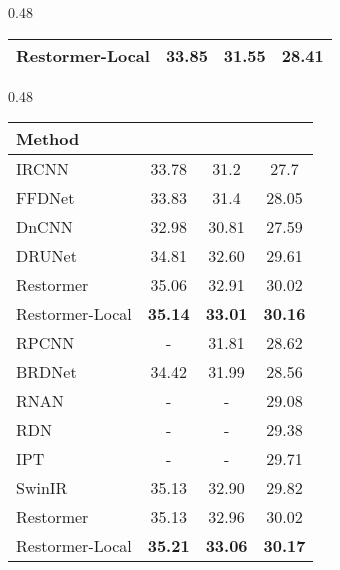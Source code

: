 \documentclass[runningheads]{llncs}
\begin{document}
\begin{table*}[t]
\begin{subtable}[t]{0.48\linewidth}
\begin{tabular}{l|ccc}
{Restormer-Local}              & \textbf{33.85}             & \textbf{31.55}             & \textbf{28.41}             \\     \bottomrule 
\end{tabular}
    \end{subtable}
\hfill
    \begin{subtable}[t]{0.48\linewidth}
    \scriptsize
    \centering
\caption{Gaussian color image denoising}
\label{table:colordenoising}
\begin{tabular}{l|ccc}
\toprule
{Method}                     &    &    &    \\ \midrule
IRCNN~\cite{zhang2017learning}      & 33.78             & 31.2              & 27.7              \\
FFDNet~\cite{zhang2018ffdnet}            & 33.83             & 31.4              & 28.05             \\
DnCNN~\cite{zhang2017beyond}                  & 32.98             & 30.81             & 27.59             \\
DRUNet~\cite{zhang2021plug}         & 34.81             & 32.60              & 29.61             \\ \midrule
Restormer~\cite{zamir2021restormer} & {35.06} & {32.91} & {30.02} \\
{Restormer-Local}            & \textbf{35.14}             & \textbf{33.01}             & \textbf{30.16}             \\ \midrule \midrule
RPCNN~\cite{xia2020identifying}           & -                 & 31.81             & 28.62             \\
BRDNet~\cite{tian2020image}        & 34.42             & 31.99             & 28.56             \\
RNAN~\cite{zhang2019residual}       & -                 & -                 & 29.08             \\
RDN~\cite{zhang2020residual}             & -                 & -                 & 29.38             \\
IPT~\cite{chen2021pre}              & -                 & -                 & 29.71             \\
SwinIR~\cite{liang2021swinir}       & 35.13             & 32.90              & 29.82             \\ \midrule
Restormer~\cite{zamir2021restormer} & {35.13} & {32.96} & {30.02} \\ 
{Restormer-Local}            & \textbf{35.21}             & \textbf{33.06}             & \textbf{30.17}       \\ \bottomrule 
\end{tabular}
    \end{subtable}

\end{table*}
\end{document}
